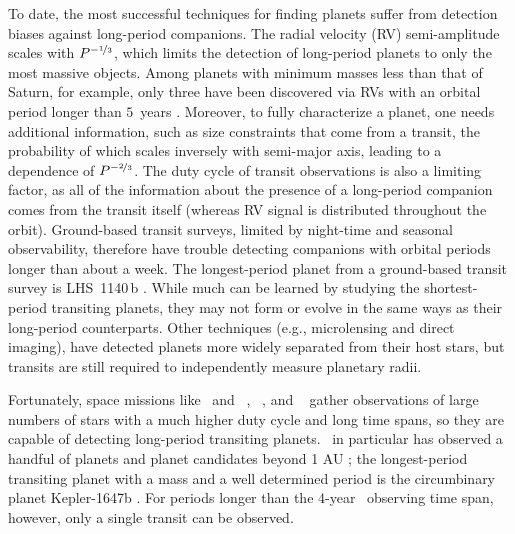 \documentclass[twocolumn]{aastex63}
\begin{document}
To date, the most successful techniques for finding planets suffer from detection biases against long-period companions. The radial velocity (RV) semi-amplitude scales with $P^{-\nicefrac{1}{3}}$, which limits the detection of long-period planets to only the most massive objects. Among planets with minimum masses less than that of Saturn, for example, only three have been discovered via RVs with an orbital period longer than $5$\ years \citep[HD\,10180\,h, GJ\,15\,A\,c, GJ\,433\,c;][]{lovis:2011,pinamonti:2018,feng:2020}. Moreover, to fully characterize a planet, one needs additional information, such as size constraints that come from a transit, the probability of which scales inversely with semi-major axis, leading to a dependence of $P^{-\nicefrac{2}{3}}$. The duty cycle of transit observations is also a limiting factor, as all of the information about the presence of a long-period companion comes from the transit itself (whereas RV signal is distributed throughout the orbit). Ground-based transit surveys, limited by night-time and seasonal observability, therefore have trouble detecting companions with orbital periods longer than about a week. The longest-period planet from a ground-based transit survey is LHS \,1140\,b \citep[$P=24.7$\ days;][]{Dittmann:2017}. While much can be learned by studying the shortest-period transiting planets, they may not form or evolve in the same ways as their long-period counterparts. Other techniques (e.g., microlensing and direct imaging), have detected planets more widely separated from their host stars, but transits are still required to independently measure planetary radii.

Fortunately, space missions like \kep\ and \ktwo\ \citep{borucki:2010,Howell:2014}, \corot\ \citep{auvergne:2009}, and \tess\ \citep{Ricker:2015} gather observations of large numbers of stars with a much higher duty cycle and long time spans, so they are capable of detecting long-period transiting planets. \kep\ in particular has observed a handful of planets and planet candidates beyond 1 AU \citep[e.g.,][]{wang:2015}; the longest-period transiting planet with a mass and a well determined period is the circumbinary planet Kepler-1647b \citep[$P=1100$\,days; $\mpl=1.5\,\mjup$;][]{kostov:2016}. For periods longer than the $4$-year \kep\ observing time span, however, only a single transit can be observed. 
\end{document}
